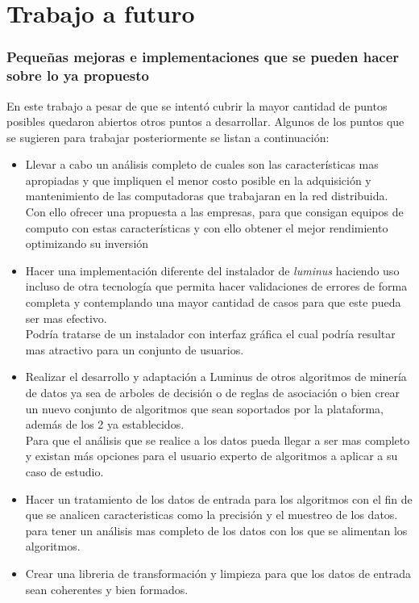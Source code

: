 \section{Trabajo a futuro}
\subsubsection{Pequeñas mejoras e implementaciones que se pueden hacer sobre lo ya propuesto}
En este trabajo a pesar de que se intentó cubrir la mayor cantidad de puntos posibles quedaron abiertos otros puntos a desarrollar. Algunos de los puntos que se sugieren para trabajar posteriormente se listan a continuación:
\begin{itemize}

	\item Llevar a cabo un análisis completo de cuales son las características mas apropiadas y que impliquen el menor costo posible en la adquisición y mantenimiento de las computadoras que trabajaran en la red distribuida.
	\\
	Con ello ofrecer una propuesta a las empresas, para que consigan equipos de computo con estas características y con ello obtener el mejor rendimiento optimizando su inversión
	\item Hacer una implementación diferente del instalador de \emph{luminus} haciendo uso incluso de otra tecnología que permita hacer validaciones de errores de forma completa y contemplando una mayor cantidad de casos para que este pueda ser mas efectivo.\\ 
	Podría tratarse de un instalador con interfaz gráfica el cual podría resultar mas atractivo para un conjunto de usuarios. 
	\item Realizar el desarrollo y adaptación a Luminus de otros algoritmos de minería de datos ya sea de arboles de decisión o de reglas de asociación o bien crear un nuevo conjunto de algoritmos que sean soportados por la plataforma, además de los 2 ya establecidos. 
	\\
	Para que el análisis que se realice a los datos pueda llegar a ser mas completo y existan más opciones para el usuario experto de algoritmos a aplicar a su caso de estudio.
	\item Hacer un tratamiento de los datos de entrada para los algoritmos con el fin de que se analicen caracteristicas como la precisión y el muestreo de los datos. para tener un análisis mas completo de los datos con los que se alimentan los algoritmos.
	\item Crear una libreria de transformación y limpieza para que los datos de entrada sean coherentes y bien formados. 

\end{itemize}
